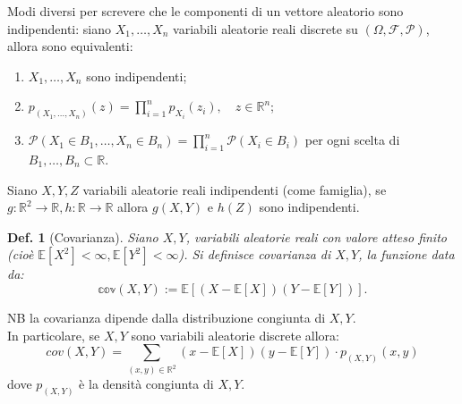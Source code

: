 \documentclass{article}
\newtheorem{definition}{Def.}[section]
\begin{document}
Modi diversi per screvere che le componenti di un vettore aleatorio sono
indipendenti: siano $X_1, \dots, X_n$ variabili aleatorie reali discrete su 
$(\Omega, \mathcal{F, P})$, allora sono equivalenti:
\begin{enumerate}
	\item $X_1, \dots, X_n$ sono indipendenti;

	\item $p_{(X_1, \dots, X_n)}(z) = \prod_{i = 1}^n p_{X_i}(z_i), \quad z \in
			\mathbb{R}^n$;
	
	\item $
			\mathcal{P}(X_1 \in B_1, \dots, X_n \in B_n) = \prod_{i = 1}^n
			\mathcal{P}(X_i \in B_i) $
		per ogni scelta di $B_1, \dots, B_n \subset \mathbb{R}$.
\end{enumerate}

Siano $X, Y, Z$ variabili aleatorie reali indipendenti (come famiglia), se $g:
\mathbb{R}^2 \to \mathbb{R}, h: \mathbb{R} \to \mathbb{R}$ allora $g(X, Y)$ e
$h(Z)$ sono indipendenti.

\begin{definition}[Covarianza]
	Siano $X, Y$, variabili aleatorie reali con valore atteso finito (cioè
	$\mathbb{E}[X^2] < \infty, \mathbb{E}[Y^2] < \infty$). Si definisce covarianza
	di $X, Y$, la funzione data da:
	\begin{equation}
		\mathbb{cov}(X, Y) := \mathbb{E}[(X - \mathbb{E}[X])(Y - \mathbb{E}[Y])].
	\end{equation}
\end{definition}
NB la covarianza dipende dalla distribuzione congiunta di $X, Y$.\\
In particolare, se $X, Y$ sono variabili aleatorie discrete allora:
\begin{equation*}
	cov(X, Y) = \sum_{(x, y) \in \mathbb{R}^2} (x - \mathbb{E}[X])(y - \mathbb{E}[Y])
	\cdot p_{(X, Y)}(x, y)
\end{equation*}
dove $p_{(X, Y)}$ è la densità congiunta di $X, Y$.\\
\end{document}
